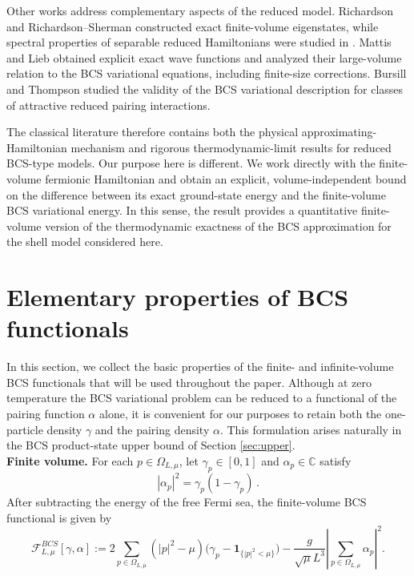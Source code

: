\documentclass[11pt]{amsart}
\theoremstyle{definition}
\numberwithin{equation}{section}
\newcommand{\C}{\mathbb C}
\newcommand{\1}{\mathbf 1}
\begin{document}
Other works address complementary aspects of the reduced model. Richardson and Richardson--Sherman \cite{Richardson1963,RichardsonSherman1964} constructed exact finite-volume eigenstates, while spectral properties of separable reduced Hamiltonians were studied in \cite{Kato1965,Kato1967}. Mattis and Lieb \cite{MattisLieb1961} obtained explicit exact wave functions and analyzed their large-volume relation to the BCS variational equations, including finite-size corrections. Bursill and Thompson \cite{BursillThompson1993} studied the validity of the BCS variational description for classes of attractive reduced pairing interactions.

The classical literature therefore contains both the physical approximating-Hamiltonian mechanism and rigorous thermodynamic-limit results for reduced BCS-type models. Our purpose here is different. We work directly with the finite-volume fermionic Hamiltonian and obtain an explicit, volume-independent bound on the difference between its exact ground-state energy and the finite-volume BCS variational energy. In this sense, the result provides a quantitative finite-volume version of the thermodynamic exactness of the BCS approximation for the shell model considered here.


\section{Elementary properties of BCS functionals}
\label{sec:functionals}
In this section, we collect the basic properties of the finite- and infinite-volume BCS functionals that will be used throughout the paper. Although at zero temperature the BCS variational problem can be reduced to a functional of the pairing function $\alpha$ alone, it is convenient for our purposes to retain both the one-particle density $\gamma$ and the pairing density $\alpha$. This formulation arises naturally in the BCS product-state upper bound of Section \ref{sec:upper}.\\
\textbf{Finite volume.}
For each \(p\in\Omega_{L,\mu}\), let \(\gamma_p\in[0,1]\) and \(\alpha_p\in\C\) satisfy
\[
 |\alpha_p|^2 = \gamma_p(1-\gamma_p)\,.
\]
After subtracting the energy of the free Fermi sea, the finite-volume BCS functional is given by
\begin{equation}\label{eq:finite-gamma-alpha}
 \mathscr F^{BCS}_{L,\mu}[\gamma,\alpha]
 :=
 2\sum_{p\in\Omega_{L,\mu}}
 \left(|p|^2 - \mu \right)\bigl(\gamma_p-\1_{\{|p|^2 < \mu\}}\bigr)
 -\frac{g}{\sqrt\mu L^3}
 \left|\sum_{p\in\Omega_{L,\mu}}\alpha_p\right|^2.
\end{equation}
\end{document}
